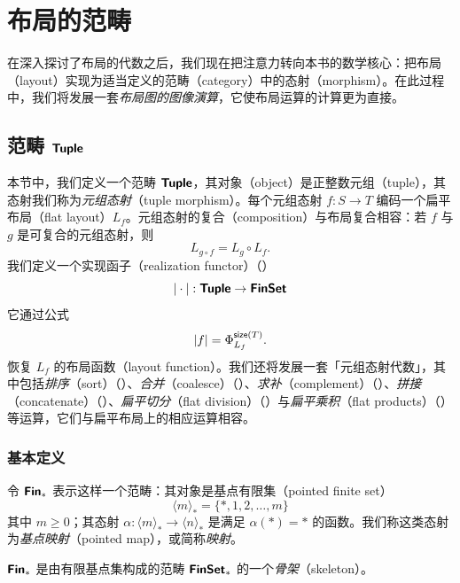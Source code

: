 \chapter{布局的范畴}\label{categorieschapter}

在深入探讨了布局的代数之后，我们现在把注意力转向本书的数学核心：把布局（layout）实现为适当定义的范畴（category）中的态射（morphism）。在此过程中，我们将发展一套\emph{布局图的图像演算}，它使布局运算的计算更为直接。

\section{范畴 ${\boldsymbol{\mathsf{Tuple}}}$}\label{thecategoryTuplesection}

本节中，我们定义一个范畴 ${\boldsymbol{\mathsf{Tuple}}}$，其对象（object）是正整数元组（tuple），其态射我们称为{\it 元组态射}（tuple morphism）。每个元组态射 $f:S \to T$ 编码一个扁平布局（flat layout）$L_f$。元组态射的复合（composition）与布局复合相容：若 $f$ 与 $g$ 是可复合的元组态射，则
\[
L_{g \circ f}= L_g \circ L_f.
\]
我们定义一个实现函子（realization functor）（）
\[
| \cdot |: {\boldsymbol{\mathsf{Tuple}}} \to {\boldsymbol{\mathsf{FinSet}}}
\]
它通过公式
\[
|f| = \Phi_{L_f}^{\mathsf{size}(T)}.
\]
恢复 $L_f$ 的布局函数（layout function）。我们还将发展一套「元组态射代数」，其中包括{\it 排序}（sort）（）、{\it 合并}（coalesce）（）、{\it 求补}（complement）（）、{\it 拼接}（concatenate）（）、{\it 扁平切分}（flat division）（）与{\it 扁平乘积}（flat products）（）等运算，它们与扁平布局上的相应运算相容。

\subsection{基本定义}



\begin{definition}
令 ${\boldsymbol{\mathsf{Fin}}}_*$ 表示这样一个范畴：其对象是基点有限集（pointed finite set）
\[
\langle m \rangle_* = \{*,1,2,\dots,m\}
\]
其中 $m \geq 0$；其态射 $\alpha: \langle m \rangle_* \to \langle n \rangle_*$ 是满足 $\alpha(*) = *$ 的函数。我们称这类态射为{\it 基点映射}（pointed map），或简称{\it 映射}。
\end{definition}

\begin{aside}
    ${\boldsymbol{\mathsf{Fin}}}_*$ 是由有限基点集构成的范畴 ${\boldsymbol{\mathsf{FinSet}}}_*$ 的一个\emph{骨架}（skeleton）。
\end{aside}

